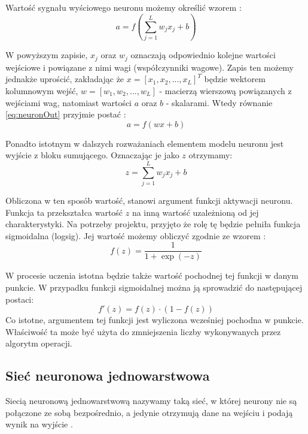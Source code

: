 \documentclass[12pt,twoside]{article}
\begin{document}
Wartość sygnału wyściowego neuronu możemy określić wzorem \cite{kiaNeuron}:
\begin{equation}
	\label{eq:neuronOut}
	a = f\left(\sum\limits_{j=1}^{L}w_{j}x_{j} + b\right)
\end{equation}

W powyższym zapisie, $x_j$ oraz $w_j$ oznaczają odpowiednio kolejne wartości wejściowe i powiązane z nimi wagi (współczynniki wagowe).
Zapis ten możemy jednakże uprościć, zakładając że $x = \left[ x_1, x_2, ..., x_L\right]^T$ będzie wektorem kolumnowym wejść, $w = \left[ w_1, w_2, ..., w_L\right]$ - macierzą wierszową powiązanych z wejściami wag, natomiast wartości $a$ oraz $b$ - skalarami.
Wtedy równanie \ref{eq:neuronOut} przyjmie postać \cite{kiaNeuron}:
\begin{equation}
	\label{eq:neuronVec}
	a = f\left( w x + b \right)
\end{equation}

Ponadto istotnym w dalszych rozważaniach elementem modelu neuronu jest wyjście z bloku sumującego. \cite{kiaNeuron}
Oznaczając je jako $z$ otrzymamy:
\begin{equation}
	\label{eq:z}
	z = \sum\limits_{j=1}^{L}w_{j}x_{j} + b
\end{equation}

Obliczona w ten sposób wartość, stanowi argument funkcji aktywacji neuronu.
Funkcja ta przekształca wartość $z$ na inną wartość uzależnioną od jej charakterystyki.
Na potrzeby projektu, przyjęto że rolę tę będzie pełniła funkcja sigmoidalna (logsig).
Jej wartość możemy obliczyć zgodnie ze wzorem \cite{nndl}:
\begin{equation}
	\label{eq:sigmoid}
	f(z) =  \frac{1}{1 +\exp(-z)}
\end{equation}

W procesie uczenia istotna będzie także wartość pochodnej tej funkcji w danym punkcie.
W przypadku funkcji sigmoidalnej można ją sprowadzić do następującej postaci\cite{nndl}:
\begin{equation}
	\label{eq:sigmoidPrime}
	f'(z) = f(z) \cdot \left(1-f\left(z\right)\right)
\end{equation}
Co istotne, argumentem tej funkcji jest wyliczona wcześniej pochodna w punkcie.
Właściwość ta może być użyta do zmniejszenia liczby wykonywanych przez algorytm operacji.


\subsection{Sieć neuronowa jednowarstwowa}
Siecią neuronową jednowarstwową nazywamy taką sieć, w której neurony nie są połączone ze sobą bezpośrednio, a jedynie otrzymują dane na wejściu i podają wynik na wyjście \cite{kiaSingleLayer}.
\end{document}
